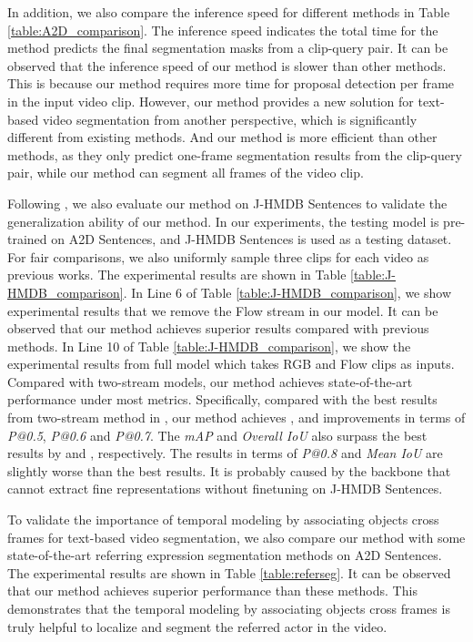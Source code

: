 \documentclass[journal]{IEEEtran}
\begin{document}
In addition, we also compare the inference speed for different methods in Table \ref{table:A2D_comparison}. The inference speed indicates the total time for the method predicts the final segmentation masks from a clip-query pair. It can be observed that the inference speed of our method is slower than other methods. This is because our method requires more time for proposal detection per frame in the input video clip. However, our method provides a new solution for text-based video segmentation from another perspective, which is significantly different from existing methods. And our method is more efficient than other methods, as they only predict one-frame segmentation results from the clip-query pair, while our method can segment all frames of the video clip.


Following \cite{gavrilyuk2018actor}, we also evaluate our method on J-HMDB Sentences to validate the generalization ability of our method. In our experiments, the testing model is pre-trained on A2D Sentences, and J-HMDB Sentences is used as a testing dataset. For fair comparisons, we also uniformly sample three clips for each video as previous works. The experimental results are shown in Table \ref{table:J-HMDB_comparison}. In Line 6 of Table \ref{table:J-HMDB_comparison}, we show experimental results that we remove the Flow stream in our model. It can be observed that our method achieves superior results compared with previous methods. In Line 10 of Table \ref{table:J-HMDB_comparison}, we show the experimental results from full model which takes RGB and Flow clips as inputs. Compared with two-stream models, our method achieves state-of-the-art performance under most metrics. Specifically, compared with the best results from two-stream method in \cite{wang2020context}, our method achieves  ,  and  improvements in terms of \emph{P@0.5}, \emph{P@0.6} and \emph{P@0.7}. The \emph{mAP} and \emph{Overall IoU} also surpass the best results by  and , respectively. The results in terms of \emph{P@0.8} and \emph{Mean IoU} are slightly worse than the best results. It is probably caused by the backbone that cannot extract fine representations without finetuning on J-HMDB Sentences.

To validate the importance of temporal modeling by associating objects cross frames for text-based video segmentation, we also compare our method with some state-of-the-art referring expression segmentation methods on A2D Sentences. The experimental results are shown in Table \ref{table:referseg}. It can be observed that our method achieves superior performance than these methods. This demonstrates that the temporal modeling by associating objects cross frames is truly helpful to localize and segment the referred actor in the video.
\end{document}
